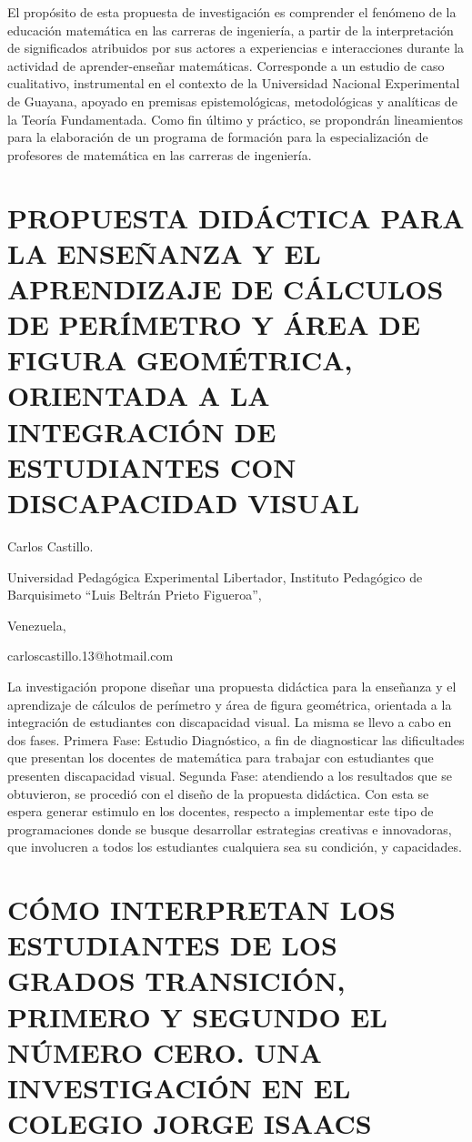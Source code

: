 El propósito de esta propuesta de investigación es comprender el fenómeno
de la educación matemática en las carreras de ingeniería, a partir
de la interpretación de significados atribuidos por sus actores a
experiencias e interacciones durante la actividad de aprender-enseñar
matemáticas. Corresponde a un estudio de caso cualitativo, instrumental
en el contexto de la Universidad Nacional Experimental de Guayana,
apoyado en premisas epistemológicas, metodológicas y analíticas de
la Teoría Fundamentada. Como fin último y práctico, se propondrán
lineamientos para la elaboración de un programa de formación para
la especialización de profesores de matemática en las carreras de
ingeniería. 


\section{PROPUESTA DIDÁCTICA PARA LA ENSEÑANZA Y EL APRENDIZAJE DE CÁLCULOS
DE PERÍMETRO Y ÁREA DE FIGURA GEOMÉTRICA, ORIENTADA A LA INTEGRACIÓN
DE ESTUDIANTES CON DISCAPACIDAD VISUAL}

\begin{datos}

Carlos Castillo.

Universidad Pedagógica Experimental Libertador, Instituto Pedagógico
de Barquisimeto “Luis Beltrán Prieto Figueroa”,

Venezuela,

carloscastillo.13@hotmail.com 

\end{datos}

La investigación propone diseñar una propuesta didáctica para la enseñanza
y el aprendizaje de cálculos de perímetro y área de figura geométrica,
orientada a la integración de estudiantes con discapacidad visual.
La misma se llevo a cabo en dos fases. Primera Fase: Estudio Diagnóstico,
a fin de diagnosticar las dificultades que presentan los docentes
de matemática para trabajar con estudiantes que presenten discapacidad
visual. Segunda Fase: atendiendo a los resultados que se obtuvieron,
se procedió con el diseño de la propuesta didáctica. Con esta se espera
generar estimulo en los docentes, respecto a implementar este tipo
de programaciones donde se busque desarrollar estrategias creativas
e innovadoras, que involucren a todos los estudiantes cualquiera sea
su condición, y capacidades.


\section{CÓMO INTERPRETAN LOS ESTUDIANTES DE LOS GRADOS TRANSICIÓN, PRIMERO
Y SEGUNDO EL NÚMERO CERO. UNA INVESTIGACIÓN EN EL COLEGIO JORGE ISAACS}

